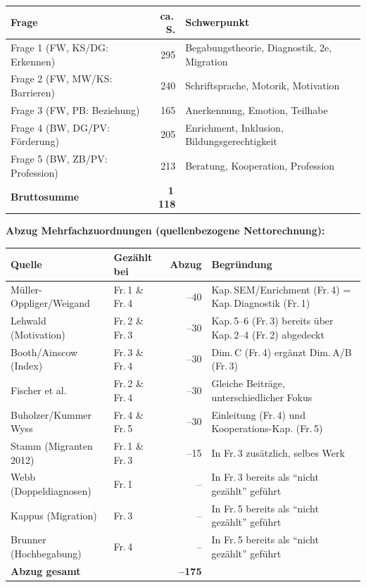 \documentclass[ngerman, a4paper]{article}
\begin{document}
\begin{tabularx}{\textwidth}{Xr@{\hspace{1.5em}}X}
\toprule
\textbf{Frage} & \textbf{ca.\,S.} & \textbf{Schwerpunkt} \\
\midrule
Frage 1 (FW, KS/DG: Erkennen) & 295 & Begabungstheorie, Diagnostik, 2e, Migration \\
Frage 2 (FW, MW/KS: Barrieren) & 240 & Schriftsprache, Motorik, Motivation \\
Frage 3 (FW, PB: Beziehung) & 165 & Anerkennung, Emotion, Teilhabe \\
Frage 4 (BW, DG/PV: Förderung) & 205 & Enrichment, Inklusion, Bildungsgerechtigkeit \\
Frage 5 (BW, ZB/PV: Profession) & 213 & Beratung, Kooperation, Profession \\
\midrule
\textbf{Bruttosumme} & \textbf{1\,118} & \\
\bottomrule
\end{tabularx}
 
\vspace{0.8em}
\textbf{Abzug Mehrfachzuordnungen (quellenbezogene Nettorechnung):}

\vspace{0.3em}
{\small
\begin{tabularx}{\textwidth}{l l r X}
\toprule
\textbf{Quelle} & \textbf{Gezählt bei} & \textbf{Abzug} & \textbf{Begründung} \\
\midrule
Müller-Oppliger/Weigand & Fr.\,1 \& Fr.\,4 & --40 & Kap.\,SEM/Enrichment (Fr.\,4) = Kap.\,Diagnostik (Fr.\,1) \\
Lehwald (Motivation) & Fr.\,2 \& Fr.\,3 & --30 & Kap.\,5--6 (Fr.\,3) bereits über Kap.\,2--4 (Fr.\,2) abgedeckt \\
Booth/Ainscow (Index) & Fr.\,3 \& Fr.\,4 & --30 & Dim.\,C (Fr.\,4) ergänzt Dim.\,A/B (Fr.\,3) \\
Fischer et al. & Fr.\,2 \& Fr.\,4 & --30 & Gleiche Beiträge, unterschiedlicher Fokus \\
Buholzer/Kummer Wyss & Fr.\,4 \& Fr.\,5 & --30 & Einleitung (Fr.\,4) und Kooperations-Kap. (Fr.\,5) \\
Stamm (Migranten 2012) & Fr.\,1 \& Fr.\,3 & --15 & In Fr.\,3 zusätzlich, selbes Werk \\
Webb (Doppeldiagnosen) & Fr.\,1 & -- & In Fr.\,3 bereits als \enquote{nicht gezählt} geführt \\
Kappus (Migration) & Fr.\,3 & -- & In Fr.\,5 bereits als \enquote{nicht gezählt} geführt \\
Brunner (Hochbegabung) & Fr.\,4 & -- & In Fr.\,5 bereits als \enquote{nicht gezählt} geführt \\
\midrule
\textbf{Abzug gesamt} & & \textbf{--175} & \\
\bottomrule
\end{tabularx}
}
\end{document}
